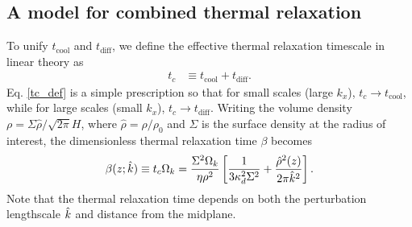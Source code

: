 \subsection{A model for combined thermal relaxation}\label{toy_relax}
To unify $t_\mathrm{cool}$ and $t_\mathrm{diff}$, we define the
effective thermal relaxation timescale in linear theory as
\begin{align}\label{tc_def}
  t_c &\equiv t_\mathrm{cool} + t _\mathrm{diff}. %
\end{align}
Eq. \ref{tc_def} is a simple prescription so
that for small scales (large $k_x$), $t_c\to t_\mathrm{cool}$, while
for large scales (small $k_x$), $t_c\to t_\mathrm{diff}$. Writing the
volume density $\rho = \Sigma\hat{\rho}/\sqrt{2\pi}H$, where
$\hat{\rho} = \rho/\rho_0$ and $\Sigma$ is the surface density at the
radius of interest, the 
dimensionless thermal
relaxation time $\beta$ becomes 
\begin{align}\label{real_beta}
  \beta(z;\hat{k}) \equiv t_c\Omega_k =
  \frac{\Sigma^2\Omega_k}{\eta\rho^2}\left[\frac{1}{3\kappa_d^2\Sigma^2} 
    + \frac{\hat{\rho}^2(z)}{2\pi \hat{k}^2}\right].
\end{align}
Note that the thermal relaxation time depends on both the perturbation lengthscale $\hat{k}$ 
and distance from the midplane. %

